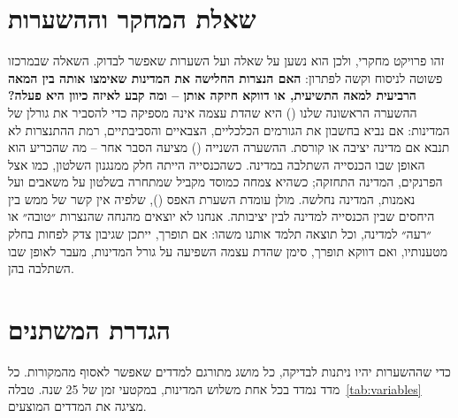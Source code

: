 \section{שאלת המחקר וההשערות}
\label{sec:problem-question}

זהו פרויקט מחקרי, ולכן הוא נשען על שאלה ועל השערות שאפשר לבדוק. השאלה שבמרכזו פשוטה לניסוח וקשה לפתרון: \textbf{האם הנצרות החלישה את המדינות שאימצו אותה בין המאה הרביעית למאה התשיעית, או דווקא חיזקה אותן – ומה קבע לאיזה כיוון היא פעלה?} ההשערה הראשונה שלנו () היא שהדת עצמה אינה מספיקה כדי להסביר את גורלן של המדינות: אם נביא בחשבון את הגורמים הכלכליים, הצבאיים והסביבתיים, רמת ההתנצרות לא תנבא אם מדינה יציבה או קורסת. ההשערה השנייה () מציעה הסבר אחר – מה שהכריע הוא האופן שבו הכנסייה השתלבה במדינה. כשהכנסייה הייתה חלק ממנגנון השלטון, כמו אצל הפרנקים, המדינה התחזקה; כשהיא צמחה כמוסד מקביל שמתחרה בשלטון על משאבים ועל נאמנות, המדינה נחלשה. מולן עומדת השערת האפס (), שלפיה אין קשר של ממש בין היחסים שבין הכנסייה למדינה לבין יציבותה. אנחנו לא יוצאים מהנחה שהנצרות ״טובה״ או ״רעה״ למדינה, וכל תוצאה תלמד אותנו משהו: אם  תופרך, ייתכן שגיבון צדק לפחות בחלק מטענותיו, ואם דווקא  תופרך, סימן שהדת עצמה השפיעה על גורל המדינות, מעבר לאופן שבו השתלבה בהן.

\section{הגדרת המשתנים}
\label{sec:problem-variables}

כדי שההשערות יהיו ניתנות לבדיקה, כל מושג מתורגם למדדים שאפשר לאסוף מהמקורות. כל מדד נמדד בכל אחת משלוש המדינות, במקטעי זמן של 25 שנה. טבלה~\ref{tab:variables} מציגה את המדדים המוצעים.

